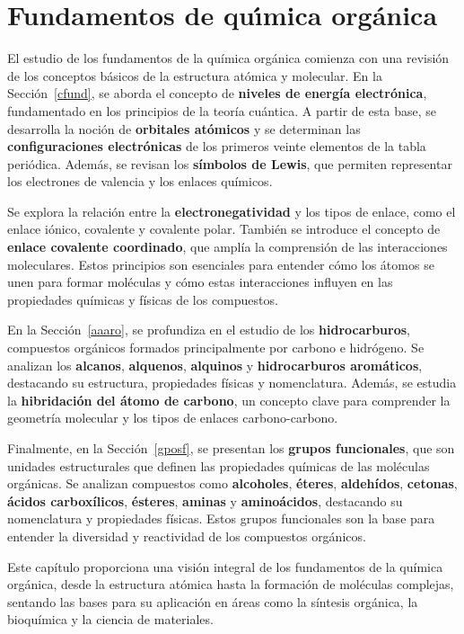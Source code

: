 \chapter[Fundamentos de quimica org\'anica]{Fundamentos de qu\'{\i}mica org\'anica}
El estudio de los fundamentos de la química orgánica comienza con una revisión de los conceptos básicos de la estructura atómica y molecular. En la  Sección~\ref{cfund}, se aborda el concepto de \textbf{niveles de energía electrónica}, fundamentado en los principios de la teoría cuántica. A partir de esta base, se desarrolla la noción de \textbf{orbitales atómicos} y se determinan las \textbf{configuraciones electrónicas} de los primeros veinte elementos de la tabla periódica. Además, se revisan los \textbf{símbolos de Lewis}, que permiten representar los electrones de valencia y los enlaces químicos.

Se explora la relación entre la \textbf{electronegatividad} y los tipos de enlace, como el enlace iónico, covalente y covalente polar. También se introduce el concepto de \textbf{enlace covalente coordinado}, que amplía la comprensión de las interacciones moleculares. Estos principios son esenciales para entender cómo los átomos se unen para formar moléculas y cómo estas interacciones influyen en las propiedades químicas y físicas de los compuestos.

En la Sección~\ref{aaaro}, se profundiza en el estudio de los \textbf{hidrocarburos}, compuestos orgánicos formados principalmente por carbono e hidrógeno. Se analizan los \textbf{alcanos}, \textbf{alquenos}, \textbf{alquinos} y \textbf{hidrocarburos aromáticos}, destacando su estructura, propiedades físicas y nomenclatura. Además, se estudia la \textbf{hibridación del átomo de carbono}, un concepto clave para comprender la geometría molecular y los tipos de enlaces carbono-carbono.

Finalmente, en la Sección~\ref{gposf}, se presentan los \textbf{grupos funcionales}, que son unidades estructurales que definen las propiedades químicas de las moléculas orgánicas. Se analizan compuestos como \textbf{alcoholes}, \textbf{éteres}, \textbf{aldehídos}, \textbf{cetonas}, \textbf{ácidos carboxílicos}, \textbf{ésteres}, \textbf{aminas} y \textbf{aminoácidos}, destacando su nomenclatura y propiedades físicas. Estos grupos funcionales son la base para entender la diversidad y reactividad de los compuestos orgánicos.

Este capítulo proporciona una visión integral de los fundamentos de la química orgánica, desde la estructura atómica hasta la formación de moléculas complejas, sentando las bases para su aplicación en áreas como la síntesis orgánica, la bioquímica y la ciencia de materiales.


